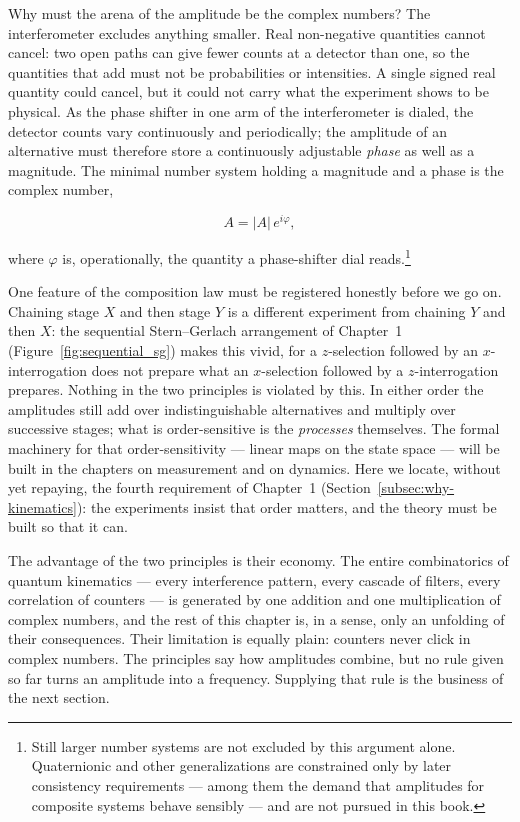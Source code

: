 Why must the arena of the amplitude be the complex numbers? The interferometer excludes anything smaller. Real non-negative quantities cannot cancel: two open paths can give fewer counts at a detector than one, so the quantities that add must not be probabilities or intensities. A single signed real quantity could cancel, but it could not carry what the experiment shows to be physical. As the phase shifter in one arm of the interferometer is dialed, the detector counts vary continuously and periodically; the amplitude of an alternative must therefore store a continuously adjustable \emph{phase} as well as a magnitude. The minimal number system holding a magnitude and a phase is the complex number,
\begin{linenomath}
\begin{equation}
    A = |A|\,e^{i\varphi} ,
\end{equation}
\end{linenomath}
where $\varphi$ is, operationally, the quantity a phase-shifter dial reads.\footnote{Still larger number systems are not excluded by this argument alone. Quaternionic and other generalizations are constrained only by later consistency requirements --- among them the demand that amplitudes for composite systems behave sensibly --- and are not pursued in this book.}

One feature of the composition law must be registered honestly before we go on. Chaining stage $X$ and then stage $Y$ is a different experiment from chaining $Y$ and then $X$: the sequential Stern--Gerlach arrangement of Chapter~1 (Figure~\ref{fig:sequential_sg}) makes this vivid, for a $z$-selection followed by an $x$-interrogation does not prepare what an $x$-selection followed by a $z$-interrogation prepares. Nothing in the two principles is violated by this. In either order the amplitudes still add over indistinguishable alternatives and multiply over successive stages; what is order-sensitive is the \emph{processes} themselves. The formal machinery for that order-sensitivity --- linear maps on the state space --- will be built in the chapters on measurement and on dynamics. Here we locate, without yet repaying, the fourth requirement of Chapter~1 (Section~\ref{subsec:why-kinematics}): the experiments insist that order matters, and the theory must be built so that it can.

The advantage of the two principles is their economy. The entire combinatorics of quantum kinematics --- every interference pattern, every cascade of filters, every correlation of counters --- is generated by one addition and one multiplication of complex numbers, and the rest of this chapter is, in a sense, only an unfolding of their consequences. Their limitation is equally plain: counters never click in complex numbers. The principles say how amplitudes combine, but no rule given so far turns an amplitude into a frequency. Supplying that rule is the business of the next section.

